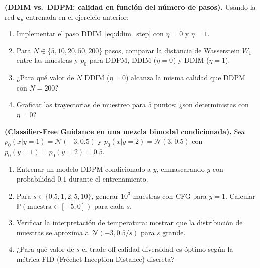 \begin{ejercicio}
\textbf{(DDIM vs.\ DDPM: calidad en función del número de pasos).}
Usando la red $\bm{\varepsilon}_\theta$ entrenada en el ejercicio anterior:
\begin{enumerate}[label=(\alph*)]
  \item Implementar el paso DDIM~\eqref{eq:ddim_step} con $\eta=0$ y $\eta=1$.
  \item Para $N\in\{5, 10, 20, 50, 200\}$ pasos, comparar la distancia de
        Wasserstein $W_1$ entre las muestras y $p_0$ para DDPM, DDIM ($\eta=0$)
        y DDIM ($\eta=1$).
  \item ¿Para qué valor de $N$ DDIM ($\eta=0$) alcanza la misma calidad que
        DDPM con $N=200$?
  \item Graficar las trayectorias de muestreo para $5$ puntos: ¿son
        deterministas con $\eta=0$?
\end{enumerate}
\end{ejercicio}

\begin{ejercicio}
\textbf{(Classifier-Free Guidance en una mezcla bimodal condicionada).}
Sea $p_0(x|y=1) = \mathcal{N}(-3,0.5)$ y $p_0(x|y=2) = \mathcal{N}(3,0.5)$
con $p_0(y=1) = p_0(y=2) = 0.5$.
\begin{enumerate}[label=(\alph*)]
  \item Entrenar un modelo DDPM condicionado a $y$, enmascarando $y$ con
        probabilidad $0.1$ durante el entrenamiento.
  \item Para $s\in\{0.5, 1, 2, 5, 10\}$, generar $10^3$ muestras con CFG
        para $y=1$. Calcular $\mathbb{P}(\text{muestra}\in[-5,0])$ para cada $s$.
  \item Verificar la interpretación de temperatura: mostrar que la distribución
        de muestras se aproxima a $\mathcal{N}(-3, 0.5/s)$ para $s$ grande.
  \item ¿Para qué valor de $s$ el trade-off calidad-diversidad es óptimo
        según la métrica FID (Fréchet Inception Distance) discreta?
\end{enumerate}
\end{ejercicio}

